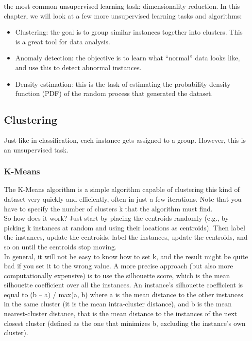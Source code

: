 \documentclass[french]{article}
\begin{document}
the most common unsupervised learning task: dimensionality reduction. In this chapter, we will look at a few more unsupervised learning tasks and algorithms:

\begin{itemize}
    \item Clustering: the goal is to group similar instances together into clusters. This is a great tool for data analysis.
    \item Anomaly detection: the objective is to learn what “normal” data looks like, and use this to detect abnormal instances.
    \item Density estimation: this is the task of estimating the probability density function (PDF) of the random process that generated the dataset.
\end{itemize}

\subsection{Clustering}

Just like in classification, each instance gets assigned to a group. However, this is an unsupervised task.

\subsubsection{K-Means}

The K-Means algorithm is a simple algorithm capable of clustering this kind of dataset very quickly and efficiently, often in just a few iterations.  Note that you have to specify the number of clusters k that the algorithm must find.\\

So how does it work? Just start by placing the centroids randomly (e.g., by picking k instances at random and using their locations as centroids). Then label the instances, update the centroids, label the instances, update the centroids, and so on until the centroids stop moving.\\

In general, it will not be easy to know how to set k, and the result might be quite bad if you set it to the wrong value. A more precise approach (but also more computationally expensive) is to use the silhouette score, which is the mean silhouette coefficient over all the instances. An instance’s silhouette coefficient is equal to (b – a) / max(a, b) where a is the mean distance to the other instances in the same cluster (it is the mean intra-cluster distance), and b is the mean nearest-cluster distance, that is the mean distance to the instances of the next closest cluster (defined as the one that minimizes b, excluding the instance’s own
cluster).
\end{document}
